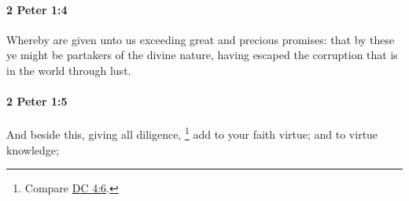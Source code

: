 		\paragraph{2 Peter 1:4} %
			\label{2PETER-1-4}

			Whereby are given unto us exceeding great and precious promises: that by these ye might be partakers of the divine nature, having escaped the corruption that is in the world through lust.

			\begin{framed}
			\scriptsize
				\begin{compactdesc}
					\item[SBLG] 
				\end{compactdesc}
			\end{framed}

		\paragraph{2 Peter 1:5} %
			\label{2PETER-1-5}

			And beside this, giving all diligence,%
				\footnote{%
					Compare \hyperref[DC4-6]{DC 4:6}.
					}
			add to your faith virtue; and to virtue knowledge;

